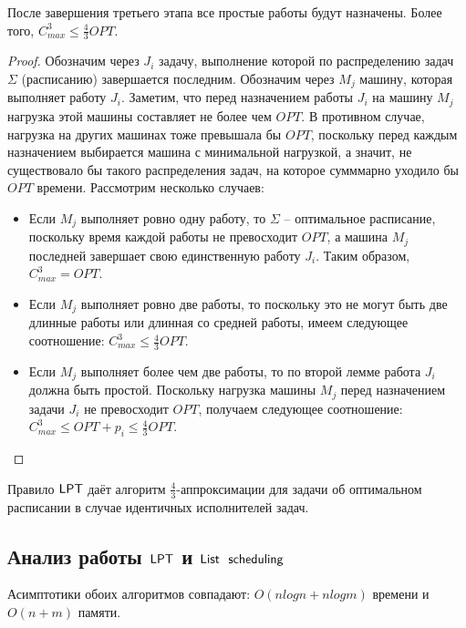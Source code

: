 \begin{lemma}
    После завершения третьего этапа все простые работы будут назначены. Более того, $C_{max}^{3} \leq \frac{4}{3}OPT$.
\end{lemma}
\begin{proof}
    Обозначим через $J_{i}$ задачу, выполнение которой по распределению задач $\Sigma$ (расписанию) завершается последним. Обозначим через $M_{j}$ машину, которая выполняет работу $J_{i}$. Заметим, что перед назначением работы $J_{i}$ на машину $M_{j}$ нагрузка этой машины составляет не более чем $OPT$. В противном случае, нагрузка на других машинах тоже превышала бы $OPT$, поскольку перед каждым назначением выбирается машина с минимальной нагрузкой, а значит, не существовало бы такого распределения задач, на которое сумммарно уходило бы $OPT$ времени. Рассмотрим несколько случаев:
    \begin{itemize}
        \item Если $M_{j}$ выполняет ровно одну работу, то $\Sigma$ -- оптимальное расписание, поскольку время каждой работы не превосходит $OPT$, а машина $M_{j}$ последней завершает свою единственную работу $J_{i}$. Таким образом, $C_{max}^{3} = OPT$.
        \item Если $M_{j}$ выполняет ровно две работы, то поскольку это не могут быть две длинные работы или длинная со средней работы, имеем следующее соотношение:  $C_{max}^{3} \leq \frac{4}{3}OPT$.
        \item Если $M_{j}$ выполняет более чем две работы, то по второй лемме работа $J_{i}$ должна быть простой. Поскольку нагрузка машины $M_{j}$ перед назначением задачи $J_{i}$ не превосходит $OPT$, получаем следующее соотношение: $C_{max}^{3} \leq OPT + p_{i} \leq \frac{4}{3}OPT$.
    \end{itemize}
\end{proof}

\begin{theorem}
    Правило $\sf{LPT}$ даёт алгоритм $\frac{4}{3}$-аппроксимации для задачи об оптимальном расписании в случае идентичных исполнителей задач.
\end{theorem}

\subsection{Анализ работы $\sf{LPT}$ и $\sf{List}$ $\sf{scheduling}$}
Асимптотики обоих алгоритмов совпадают: $O(nlogn + nlogm)$ времени и $O(n + m)$ памяти.


